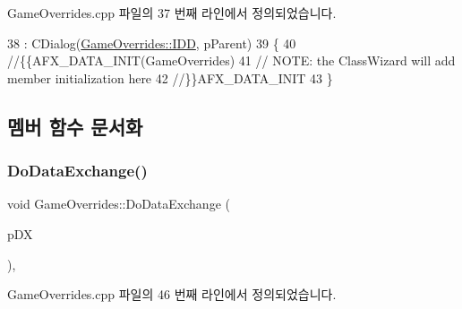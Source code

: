 Game\+Overrides.\+cpp 파일의 37 번째 라인에서 정의되었습니다.


\begin{DoxyCode}
38   : CDialog(\mbox{\hyperlink{class_game_overrides_a0da33253aeb47bae8ed674bc210f2b12a37a4d9c26e79427fdda81e489146b745}{GameOverrides::IDD}}, pParent)
39 \{
40   \textcolor{comment}{//\{\{AFX\_DATA\_INIT(GameOverrides)}
41   \textcolor{comment}{// NOTE: the ClassWizard will add member initialization here}
42   \textcolor{comment}{//\}\}AFX\_DATA\_INIT}
43 \}
\end{DoxyCode}


\subsection{멤버 함수 문서화}
\mbox{\label{class_game_overrides_aa12ac9e6f357416fd5ae76a241bf3e95}} 
\subsubsection{\texorpdfstring{Do\+Data\+Exchange()}{DoDataExchange()}}
{\footnotesize\ttfamily void Game\+Overrides\+::\+Do\+Data\+Exchange (\begin{DoxyParamCaption}\item[{C\+Data\+Exchange $\ast$}]{p\+DX }\end{DoxyParamCaption})\hspace{0.3cm}{\ttfamily [protected]}, {\ttfamily [virtual]}}



Game\+Overrides.\+cpp 파일의 46 번째 라인에서 정의되었습니다.


